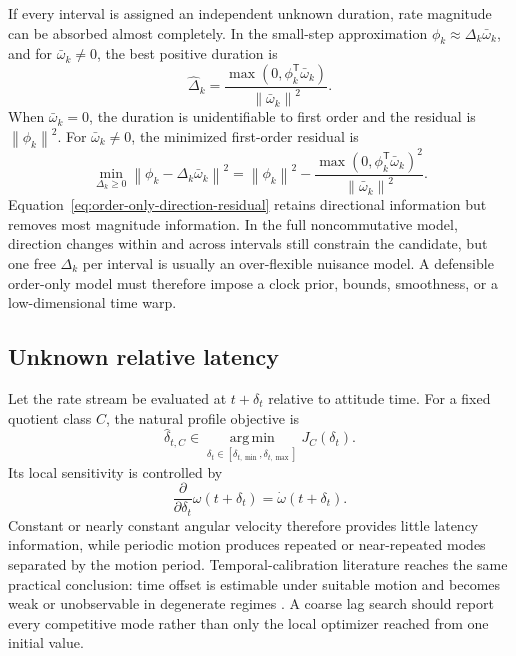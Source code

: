 \documentclass[11pt]{article}
\newcommand{\T}{\mathsf{T}}
\newcommand{\argmin}{\operatorname*{arg\,min}}
\newcommand{\norm}[1]{\left\lVert #1 \right\rVert}
\begin{document}
    If every interval is assigned an independent unknown duration, rate magnitude can be
    absorbed almost completely. In the small-step approximation
    $\phi_k\approx\Delta_k\bar\omega_k$, and for $\bar\omega_k\ne0$, the best positive
    duration is
    \begin{equation}
        \widehat\Delta_k
        =\frac{\max(0,\phi_k^{\T}\bar\omega_k)}{\norm{\bar\omega_k}^2}.
    \end{equation}
    When $\bar\omega_k=0$, the duration is unidentifiable to first order and the residual is
    $\norm{\phi_k}^2$. For $\bar\omega_k\ne0$, the minimized first-order residual is
    \begin{equation}
        \min_{\Delta_k\ge0}\norm{\phi_k-\Delta_k\bar\omega_k}^2
        =\norm{\phi_k}^2
        -\frac{\max(0,\phi_k^{\T}\bar\omega_k)^2}
        {\norm{\bar\omega_k}^2}.
        \label{eq:order-only-direction-residual}
    \end{equation}
    Equation~\eqref{eq:order-only-direction-residual} retains directional information but
    removes most magnitude information. In the full noncommutative model, direction changes
    within and across intervals still constrain the candidate, but one free $\Delta_k$ per
    interval is usually an over-flexible nuisance model. A defensible order-only model must
    therefore impose a clock prior, bounds, smoothness, or a low-dimensional time warp.

    \subsection{Unknown relative latency}

    Let the rate stream be evaluated at $t+\delta_t$ relative to attitude time. For a fixed
    quotient class $C$, the natural profile objective is
    \begin{equation}
        \widehat\delta_{t,C}
        \in\argmin_{\delta_t\in[\delta_{t,\min},\delta_{t,\max}]}J_C(\delta_t).
        \label{eq:latency-profile}
    \end{equation}
    Its local sensitivity is controlled by
    \begin{equation}
        \frac{\partial}{\partial\delta_t}\omega(t+\delta_t)
        =\dot\omega(t+\delta_t).
    \end{equation}
    Constant or nearly constant angular velocity therefore provides little latency
    information, while periodic motion produces repeated or near-repeated modes separated by
    the motion period. Temporal-calibration literature reaches the same practical
    conclusion: time offset is estimable under suitable motion and becomes weak or
    unobservable in degenerate regimes \cite{liMourikis2014}. A coarse lag search should
    report every competitive mode rather than only the local optimizer reached from one
    initial value.
\end{document}
